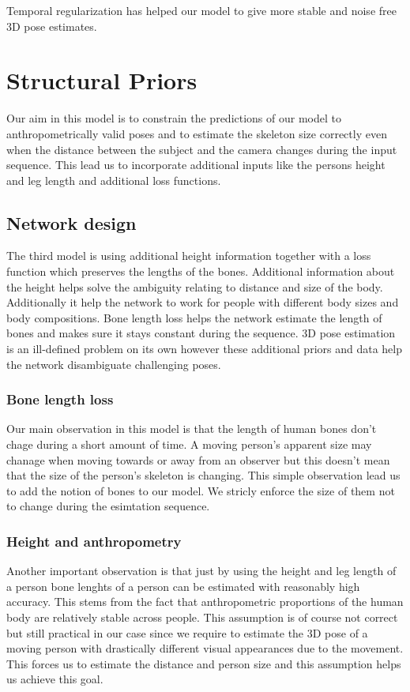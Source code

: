 Temporal regularization has helped our model to give more stable and noise free 3D pose estimates.


\section{Structural Priors}

Our aim in this model is to constrain the predictions of our model to anthropometrically valid poses and to estimate the skeleton size correctly even when the distance between the subject and the camera changes during the input sequence. This lead us to incorporate additional inputs like the persons height and leg length and additional loss functions.

\subsection{Network design}

The third model is using additional height information together with a loss function which preserves the lengths of the bones. Additional information about the height helps solve the ambiguity relating to distance and size of the body. Additionally it help the network to work for people with different body sizes and body compositions. Bone length loss helps the network estimate the length of bones and makes sure it stays constant during the sequence. 3D pose estimation is an ill-defined problem on its own however these additional priors and data help the network disambiguate challenging poses.

\subsubsection{Bone length loss}

Our main observation in this model is that the length of human bones don't chage during a short amount of time. A moving person's apparent size may chanage when moving towards or away from an observer but this doesn't mean that the size of the person's skeleton is changing. This simple observation lead us to add the notion of bones to our model. We stricly enforce the size of them not to change during the esimtation sequence.

\subsubsection{Height and anthropometry}

Another important observation is that just by using the height and leg length of a person bone lenghts of a person can be estimated with reasonably high accuracy. This stems from the fact that anthropometric proportions of the human body are relatively stable across people. This assumption is of course not correct but still practical in our case since we require to estimate the 3D pose of a moving person with drastically different visual appearances due to the movement. This forces us to estimate the distance and person size and this assumption helps us achieve this goal.

